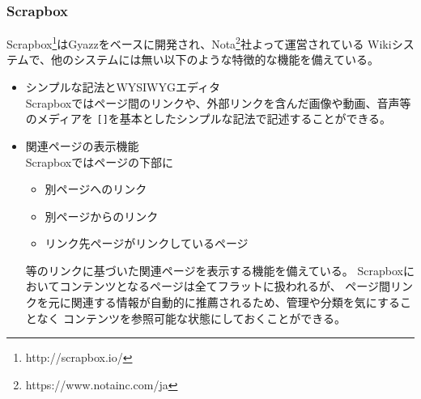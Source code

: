 \subsubsection{Scrapbox}
Scrapbox\footnote{http://scrapbox.io/}はGyazz\cite{Gyazz}をベースに開発され、Nota\footnote{\textsf{https://www.notainc.com/ja}}社よって運営されている
Wikiシステムで、他のシステムには無い以下のような特徴的な機能を備えている。
\begin{itemize}
    \item シンプルな記法とWYSIWYGエディタ\\
        Scrapboxではページ間のリンクや、外部リンクを含んだ画像や動画、音声等のメディアを
        \texttt{[]}を基本としたシンプルな記法で記述することができる。

    \item 関連ページの表示機能\\
        Scrapboxではページの下部に
        \begin{itemize}
                  \item 別ページへのリンク
                  \item 別ページからのリンク
                  \item リンク先ページがリンクしているページ
        \end{itemize}等のリンクに基づいた関連ページを表示する機能を備えている。
        Scrapboxにおいてコンテンツとなるページは全てフラットに扱われるが、
        ページ間リンクを元に関連する情報が自動的に推薦されるため、管理や分類を気にすることなく
        コンテンツを参照可能な状態にしておくことができる。
\end{itemize}

